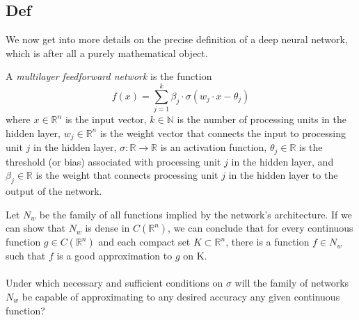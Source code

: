 \documentclass[../main.tex]{subfiles}
\begin{document}
	 \subsection{Def}
	 \noindent  We now get into more details on the precise definition of a deep neural network, which is after all a purely mathematical object. 
	 \begin{definition} A \textit{multilayer feedforward network} is the function
	 	$$f(x)=\sum_{j=1}^k \beta_j \cdot \sigma(w_j \cdot x - \theta_j)$$
	 	where $x \in \mathbb{R}^n$ is the input vector, $k \in \mathbb{N}$ is the number of processing units in the hidden layer, $w_j \in \mathbb{R}^n$ is the weight vector that connects the input to processing unit $j$ in the hidden layer, $\sigma : \mathbb{R} \rightarrow \mathbb{R}$ is an activation function, $\theta_j \in \mathbb{R}$ is the threshold (or bias) associated with processing unit $j$ in the hidden layer, and $\beta_j \in \mathbb{R}$ is the weight that connects processing unit $j$ in the hidden layer to the output of the network.
	 	
	 	
	 \end{definition}
	 
	 \noindent Let $N_{w}$ be the family of all functions implied by the network's architecture.  If we can show that $N_{w}$ is dense in $C(\mathbb{R}^n)$, we can conclude that for every continuous function $g \in C(\mathbb{R}^n) $ and each compact set $K \subset \mathbb{R}^n$, there is a function $f \in N_{w}$ such that $f$ is a good approximation to $g$ on K. \\ \\
	 \noindent Under which necessary and sufficient conditions on $\sigma$ will the family of networks $N_w$ be capable of approximating to any desired accuracy any given continuous function?
	 
	
\end{document}
